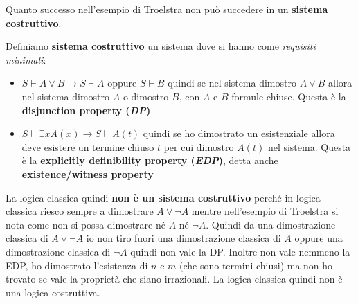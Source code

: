 \documentclass[a4paper,12pt, oneside]{book}
\begin{document}
Quanto successo nell'esempio di Troelstra non può succedere in un
\textbf{sistema costruttivo}.
\begin{definizione}
  Definiamo \textbf{sistema costruttivo} un sistema dove si hanno come
  \textit{requisiti minimali}: 
\begin{itemize}
  \item $S\vdash A\lor B\to S\vdash A\mbox{ oppure } S\vdash B$ quindi se
  nel sistema dimostro $A\lor B$ allora nel sistema dimostro $A$ o dimostro $B$,
  con $A$ e $B$ formule chiuse. Questa è la \textbf{disjunction property
    (\textit{DP})}  
  \item $S\vdash\exists xA(x)\to S\vdash A(t)$ quindi se ho dimostrato un
  esistenziale allora deve esistere un termine chiuso $t$ per cui dimostro
  $A(t)$ nel sistema. Questa è la \textbf{explicitly definibility property
    (\textit{EDP})}, detta anche \textbf{existence/witness property}
\end{itemize}
\end{definizione}
La logica classica quindi \textbf{non è un sistema costruttivo} perché in logica
classica riesco sempre a dimostrare $A\lor\neg A$ mentre nell'esempio di
Troelstra si nota come non si possa dimostrare né $A$ né $\neg A$. Quindi da una
dimostrazione classica di $A\lor\neg A$ io non tiro fuori una dimostrazione
classica di $A$ oppure una dimostrazione classica di $\neg A$ quindi non vale la
DP. Inoltre non vale nemmeno la EDP, ho dimostrato l'esistenza di $n$ e $m$ (che
sono termini chiusi) ma non ho trovato se vale la proprietà che siano
irrazionali. La logica classica quindi non è una logica costruttiva.
\end{document}
